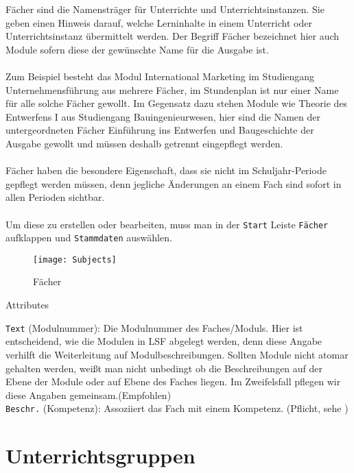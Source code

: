 Fächer sind die Namensträger für Unterrichte und Unterrichtsinstanzen. Sie geben einen Hinweis darauf, welche Lerninhalte in einem Unterricht oder Unterrichtsinstanz übermittelt werden. Der Begriff Fächer bezeichnet hier auch Module sofern diese der gewünschte Name für die Ausgabe ist.\\
\\
Zum Beispiel besteht das Modul International Marketing im Studiengang Unternehmensführung aus mehrere Fächer, im Stundenplan ist nur einer Name für alle solche Fächer gewollt. Im Gegensatz dazu stehen Module wie Theorie des Entwerfens I aus Studiengang Bauingenieurwesen, hier sind die Namen der untergeordneten Fächer Einführung ins Entwerfen und Baugeschichte der Ausgabe gewollt und müssen deshalb getrennt eingepflegt werden.\\
\\ 
Fächer haben die besondere Eigenschaft, dass sie nicht im Schuljahr-Periode gepflegt werden müssen, denn jegliche Änderungen an einem Fach sind sofort in allen Perioden sichtbar.\\
\\
Um diese zu erstellen oder bearbeiten, muss man in der \texttt{Start} Leiste \texttt{Fächer} aufklappen und \texttt{Stammdaten} auswählen.

\begin{figure}[h]
	\centering
	\texttt{[image: Subjects]}
	\vspace{-5pt}
	\caption{Fächer}
	\label{fig:subjects}
\end{figure}

\noindent
{\large Attributes\par}
\vspace{8pt}

\noindent
\texttt{Text} (Modulnummer): Die Modulnummer des Faches/Moduls. Hier ist entscheidend, wie die Modulen in LSF abgelegt werden, denn diese Angabe verhilft die Weiterleitung auf Modulbeschreibungen. Sollten Module nicht atomar gehalten werden, weißt man nicht unbedingt ob die Beschreibungen auf der Ebene der Module oder auf Ebene des Faches liegen. Im Zweifelsfall pflegen wir diese Angaben gemeinsam.(Empfohlen)\\

\noindent
\texttt{Beschr.} (Kompetenz): Assoziiert das Fach mit einem Kompetenz. (Pflicht, sehe )\\

\section{Unterrichtsgruppen}

